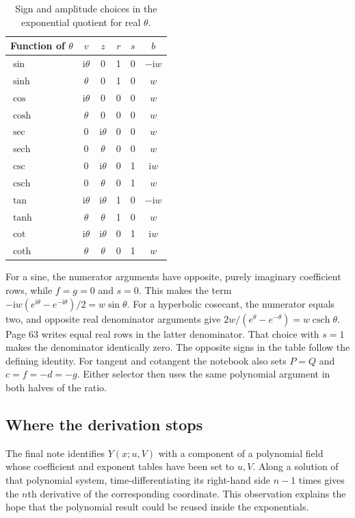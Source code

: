 \documentclass[11pt,letterpaper]{article}
\newcommand{\ii}{\mathrm{i}}
\newcommand{\src}[1]{\par\smallskip\noindent{\small\itshape Notebook, #1.}\par\medskip}
\DeclareMathOperator{\sech}{sech}
\DeclareMathOperator{\csch}{csch}
\begin{document}
\begin{table}[!ht]
\centering
\caption{Sign and amplitude choices in the exponential quotient for real \(\theta\).}
\label{tab:selectors}\smallskip
\begin{tabular}{@{}lccccc@{}}
\toprule
Function of \(\theta\)&\(v\)&\(z\)&\(r\)&\(s\)&\(b\)\\
\midrule
\(\sin\)  &\(\ii\theta\)&0&1&0&\(-\ii w\)\\
\(\sinh\) &\(\theta\)&0&1&0&\(w\)\\
\(\cos\)  &\(\ii\theta\)&0&0&0&\(w\)\\
\(\cosh\) &\(\theta\)&0&0&0&\(w\)\\
\(\sec\)  &0&\(\ii\theta\)&0&0&\(w\)\\
\(\sech\) &0&\(\theta\)&0&0&\(w\)\\
\(\csc\)  &0&\(\ii\theta\)&0&1&\(\ii w\)\\
\(\csch\) &0&\(\theta\)&0&1&\(w\)\\
\(\tan\)  &\(\ii\theta\)&\(\ii\theta\)&1&0&\(-\ii w\)\\
\(\tanh\) &\(\theta\)&\(\theta\)&1&0&\(w\)\\
\(\cot\)  &\(\ii\theta\)&\(\ii\theta\)&0&1&\(\ii w\)\\
\(\coth\) &\(\theta\)&\(\theta\)&0&1&\(w\)\\
\bottomrule
\end{tabular}
\end{table}

For a sine, the numerator arguments have opposite, purely imaginary
coefficient rows, while \(f=g=0\) and \(s=0\). This makes the term
\(-\ii w(e^{\ii\theta}-e^{-\ii\theta})/2=w\sin\theta\).
For a hyperbolic cosecant, the numerator equals two, and opposite real
denominator arguments give \(2w/(e^\theta-e^{-\theta})=w\csch\theta\).
Page 63 writes equal real rows in the latter denominator. That choice
with \(s=1\) makes the denominator identically zero. The opposite signs
in the table follow the defining identity. For tangent and cotangent the
notebook also sets \(P=Q\) and \(c=f=-d=-g\). Either selector then uses the
same polynomial argument in both halves of the ratio.
\src{pp.~58--65}

\subsection{Where the derivation stops}
The final note identifies \(Y(x;u,V)\) with a component of a polynomial field
whose coefficient and exponent tables have been set to \(u,V\). Along a
solution of that polynomial system, time-differentiating its right-hand side
\(n-1\) times gives the \(n\)th derivative of the corresponding coordinate.
This observation explains the hope that the polynomial result could be
reused inside the exponentials.
\end{document}
